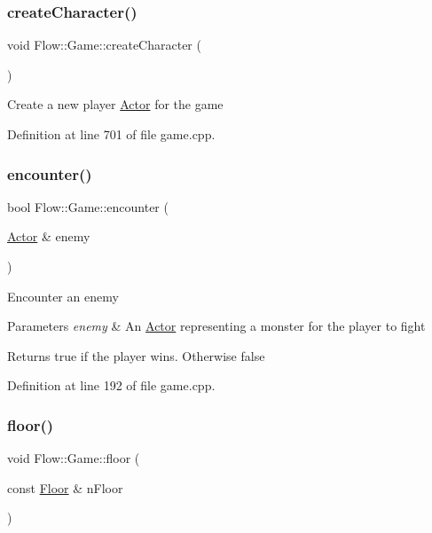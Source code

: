 \subsubsection{\texorpdfstring{create\+Character()}{createCharacter()}}
{\footnotesize\ttfamily void Flow\+::\+Game\+::create\+Character (\begin{DoxyParamCaption}{ }\end{DoxyParamCaption})}

Create a new player \hyperlink{class_flow_1_1_actor}{Actor} for the game 

Definition at line 701 of file game.\+cpp.

\hypertarget{class_flow_1_1_game_a6dae12a63733a289b34a03dd8d709139}{}\label{class_flow_1_1_game_a6dae12a63733a289b34a03dd8d709139} 
\subsubsection{\texorpdfstring{encounter()}{encounter()}}
{\footnotesize\ttfamily bool Flow\+::\+Game\+::encounter (\begin{DoxyParamCaption}\item[{\hyperlink{class_flow_1_1_actor}{Actor} \&}]{enemy }\end{DoxyParamCaption})}

Encounter an enemy 
\begin{DoxyParams}{Parameters}
{\em enemy} & An \hyperlink{class_flow_1_1_actor}{Actor} representing a monster for the player to fight \\
\hline
\end{DoxyParams}
\begin{DoxyReturn}{Returns}
true if the player wins. Otherwise false 
\end{DoxyReturn}


Definition at line 192 of file game.\+cpp.

\hypertarget{class_flow_1_1_game_a00ae48e872335db0232eeb370159a3d7}{}\label{class_flow_1_1_game_a00ae48e872335db0232eeb370159a3d7} 
\subsubsection{\texorpdfstring{floor()}{floor()}\hspace{0.1cm}{\footnotesize\ttfamily [1/2]}}
{\footnotesize\ttfamily void Flow\+::\+Game\+::floor (\begin{DoxyParamCaption}\item[{const \hyperlink{class_flow_1_1_floor}{Floor} \&}]{n\+Floor }\end{DoxyParamCaption})}

